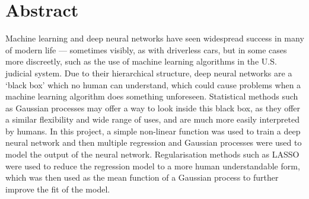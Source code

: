 
\chapter*{Abstract}

Machine learning and deep neural networks have seen widespread success in many of modern life --- sometimes visibly, as with driverless cars, but in some cases more discreetly, such as the use of machine learning algorithms in the U.S. judicial system.
Due to their hierarchical structure, deep neural networks are a `black box' which no human can understand, which could cause problems when a machine learning algorithm does something unforeseen.
Statistical methods such as Gaussian processes may offer a way to look inside this black box, as they offer a similar flexibility and wide range of uses, and are much more easily interpreted by humans.
In this project, a simple non-linear function was used to train a deep neural network and then multiple regression and Gaussian processes were used to model the output of the neural network.
Regularisation methods such as LASSO were used to reduce the regression model to a more human understandable form, which was then used as the mean function of a Gaussian process to further improve the fit of the model.
